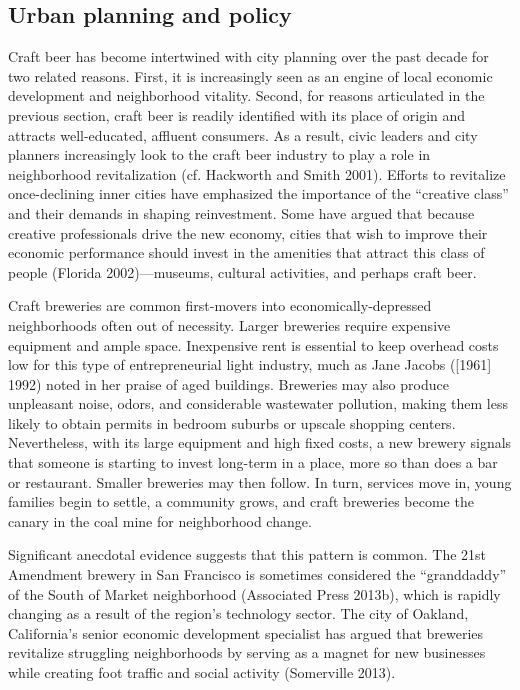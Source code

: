 \documentclass[]{article}
\begin{document}
\subsection{Urban planning and policy}\label{urban-planning-and-policy}

Craft beer has become intertwined with city planning over the past
decade for two related reasons. First, it is increasingly seen as an
engine of local economic development and neighborhood vitality. Second,
for reasons articulated in the previous section, craft beer is readily
identified with its place of origin and attracts well-educated, affluent
consumers. As a result, civic leaders and city planners increasingly
look to the craft beer industry to play a role in neighborhood
revitalization (cf. Hackworth and Smith 2001). Efforts to revitalize
once-declining inner cities have emphasized the importance of the
``creative class'' and their demands in shaping reinvestment. Some have
argued that because creative professionals drive the new economy, cities
that wish to improve their economic performance should invest in the
amenities that attract this class of people (Florida 2002)---museums,
cultural activities, and perhaps craft beer.

Craft breweries are common first-movers into economically-depressed
neighborhoods often out of necessity. Larger breweries require expensive
equipment and ample space. Inexpensive rent is essential to keep
overhead costs low for this type of entrepreneurial light industry, much
as Jane Jacobs ({[}1961{]} 1992) noted in her praise of aged buildings.
Breweries may also produce unpleasant noise, odors, and considerable
wastewater pollution, making them less likely to obtain permits in
bedroom suburbs or upscale shopping centers. Nevertheless, with its
large equipment and high fixed costs, a new brewery signals that someone
is starting to invest long-term in a place, more so than does a bar or
restaurant. Smaller breweries may then follow. In turn, services move
in, young families begin to settle, a community grows, and craft
breweries become the canary in the coal mine for neighborhood change.

Significant anecdotal evidence suggests that this pattern is common. The
21st Amendment brewery in San Francisco is sometimes considered the
``granddaddy'' of the South of Market neighborhood (Associated Press
2013b), which is rapidly changing as a result of the region's technology
sector. The city of Oakland, California's senior economic development
specialist has argued that breweries revitalize struggling neighborhoods
by serving as a magnet for new businesses while creating foot traffic
and social activity (Somerville 2013).
\end{document}
